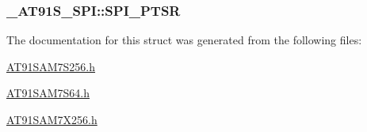 \hypertarget{struct__AT91S__SPI_185ef5c1beda2534149dbfd1861597e0}{
\subsubsection{ {\bf \_\-AT91S\_\-SPI::SPI\_\-PTSR}}}
\label{struct__AT91S__SPI_185ef5c1beda2534149dbfd1861597e0}




The documentation for this struct was generated from the following files:\begin{CompactItemize}
\item 
\hyperlink{AT91SAM7S256_8h}{AT91SAM7S256.h}\item 
\hyperlink{AT91SAM7S64_8h}{AT91SAM7S64.h}\item 
\hyperlink{AT91SAM7X256_8h}{AT91SAM7X256.h}\end{CompactItemize}
